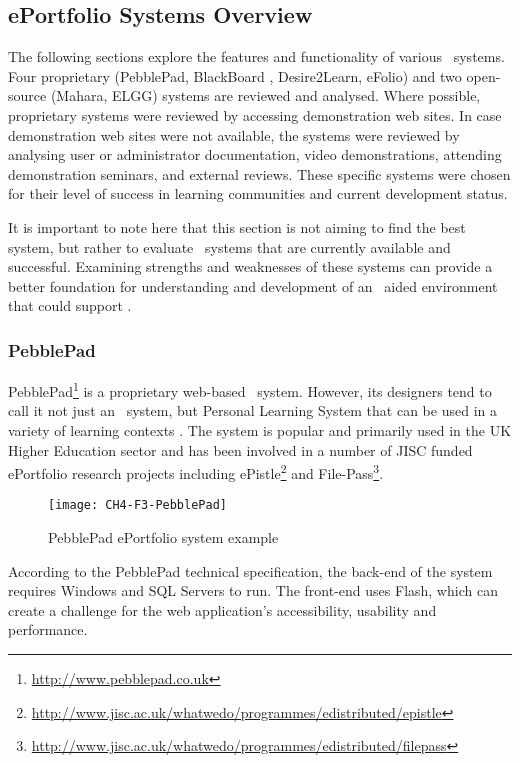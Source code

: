 \subsection{ePortfolio Systems Overview}
The following sections explore the features and functionality of various
\ep~systems. Four proprietary (PebblePad, BlackBoard \ep, Desire2Learn, eFolio)
and two open-source (Mahara, ELGG) systems are reviewed and analysed. Where
possible, proprietary systems were reviewed by accessing demonstration web
sites. In case demonstration web sites were not available, the systems were
reviewed by analysing user or administrator documentation, video demonstrations,
attending demonstration seminars, and external reviews. These specific systems
were chosen for their level of success in learning communities and current
development status.

It is important to note here that this section is not aiming to find the best
system, but rather to evaluate \ep~systems that are currently available and
successful. Examining strengths and weaknesses of these systems can provide a
better foundation for understanding and development of an \ep~aided environment
that could support \LLLsn.

\subsubsection{PebblePad}

PebblePad\footnote{\url{http://www.pebblepad.co.uk}} is a proprietary web-based
\ep~system. However, its designers tend to call it not just an \ep~system, but
Personal Learning System that can be used in a variety of learning contexts
\citep{PebbleLearningLtd2010}. The system is popular and primarily used in the
UK Higher Education sector and has been involved in a number of JISC funded
ePortfolio research projects including
ePistle\footnote{\url{http://www.jisc.ac.uk/whatwedo/programmes/edistributed/epistle}}
and File-Pass\footnote{\url{http://www.jisc.ac.uk/whatwedo/programmes/edistributed/filepass}}.

\begin{figure}[htb]
\centering
\texttt{[image: CH4-F3-PebblePad]}
\caption[PebblePad ePortfolio system example]{PebblePad ePortfolio system example
\citep{PebbleLearningLtd}}
\label{fig:ppep}
\end{figure}

According to the PebblePad technical specification, the back-end of the system
requires Windows and SQL Servers to run. The front-end uses Flash, which can
create a challenge for the web application's accessibility, usability and
performance.

